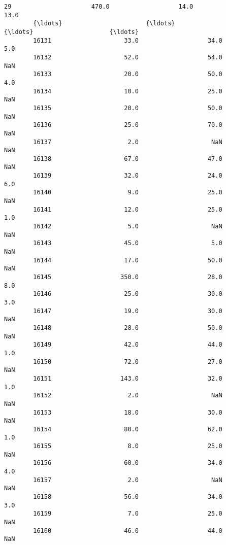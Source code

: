 \documentclass[11pt]{article}
\begin{document}
\begin{Verbatim}[commandchars=\\\{\}]
        29                      470.0                   14.0                    13.0   
        {\ldots}                       {\ldots}                    {\ldots}                     {\ldots}   
        16131                    33.0                   34.0                     5.0   
        16132                    52.0                   54.0                     NaN   
        16133                    20.0                   50.0                     4.0   
        16134                    10.0                   25.0                     NaN   
        16135                    20.0                   50.0                     NaN   
        16136                    25.0                   70.0                     NaN   
        16137                     2.0                    NaN                     NaN   
        16138                    67.0                   47.0                     NaN   
        16139                    32.0                   24.0                     6.0   
        16140                     9.0                   25.0                     NaN   
        16141                    12.0                   25.0                     1.0   
        16142                     5.0                    NaN                     NaN   
        16143                    45.0                    5.0                     NaN   
        16144                    17.0                   50.0                     NaN   
        16145                   350.0                   28.0                     8.0   
        16146                    25.0                   30.0                     3.0   
        16147                    19.0                   30.0                     NaN   
        16148                    28.0                   50.0                     NaN   
        16149                    42.0                   44.0                     1.0   
        16150                    72.0                   27.0                     NaN   
        16151                   143.0                   32.0                     1.0   
        16152                     2.0                    NaN                     NaN   
        16153                    18.0                   30.0                     NaN   
        16154                    80.0                   62.0                     1.0   
        16155                     8.0                   25.0                     NaN   
        16156                    60.0                   34.0                     4.0   
        16157                     2.0                    NaN                     NaN   
        16158                    56.0                   34.0                     3.0   
        16159                     7.0                   25.0                     NaN   
        16160                    46.0                   44.0                     NaN   
        

\end{Verbatim}
\end{document}
